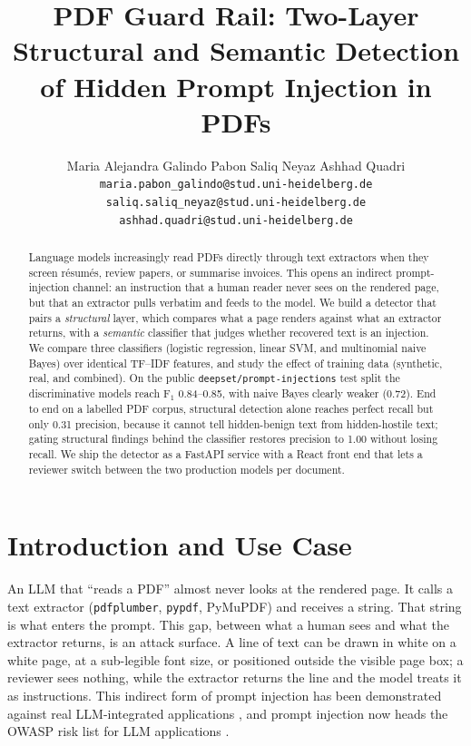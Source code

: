 \documentclass[11pt]{article}
\title{PDF Guard Rail: Two-Layer Structural and Semantic Detection of Hidden Prompt Injection in PDFs}
\author{
  Maria Alejandra Galindo Pabon \quad Saliq Neyaz \quad Ashhad Quadri \\[0.4em]
  \texttt{maria.pabon\_galindo@stud.uni-heidelberg.de} \\
  \texttt{saliq.saliq\_neyaz@stud.uni-heidelberg.de} \\
  \texttt{ashhad.quadri@stud.uni-heidelberg.de}
}
\begin{document}
\maketitle

\begin{abstract}
Language models increasingly read PDFs directly through text extractors when
they screen r\'esum\'es, review papers, or summarise invoices. This opens an
indirect prompt-injection channel: an instruction that a human reader never
sees on the rendered page, but that an extractor pulls verbatim and feeds to
the model. We build a detector that pairs a \emph{structural} layer, which
compares what a page renders against what an extractor returns, with a
\emph{semantic} classifier that judges whether recovered text is an injection.
We compare three classifiers (logistic regression, linear SVM, and
multinomial naive Bayes) over identical TF--IDF features, and study the effect
of training data (synthetic, real, and combined). On the public
\texttt{deepset/prompt-injections} test split the discriminative models reach
$\text{F}_1$ 0.84--0.85, with naive Bayes clearly weaker (0.72). End to end on a
labelled PDF corpus, structural detection alone reaches perfect recall but only
0.31 precision, because it cannot tell hidden-benign text from hidden-hostile
text; gating structural findings behind the classifier restores precision to
1.00 without losing recall. We ship the detector as a FastAPI service with a
React front end that lets a reviewer switch between the two production models
per document.
\end{abstract}

\section{Introduction and Use Case}

An LLM that ``reads a PDF'' almost never looks at the rendered page. It calls a
text extractor (\texttt{pdfplumber}, \texttt{pypdf}, PyMuPDF) and receives a
string. That string is what enters the prompt. This gap, between what a human
sees and what the extractor returns, is an attack surface. A line of
text can be drawn in white on a white page, at a sub-legible font size, or
positioned outside the visible page box; a reviewer sees nothing, while the
extractor returns the line and the model treats it as instructions. This
indirect form of prompt injection has been demonstrated against real
LLM-integrated applications \citep{greshake2023injection, perez2022ignore}, and
prompt injection now heads the OWASP risk list for LLM applications
\citep{owasp2023llm}.
\end{document}
